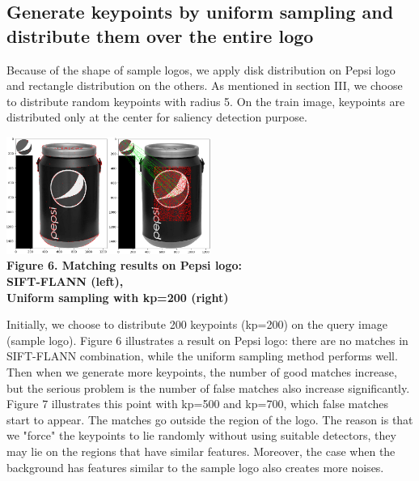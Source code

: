 \documentclass[letterpaper, 10 pt, conference]{ieeeconf}  %
\begin{document}
\subsection{Generate keypoints by uniform sampling and distribute them over the entire logo}
Because of the shape of sample logos, we apply disk distribution on Pepsi logo and rectangle distribution on the others. As mentioned in section III, we choose to distribute random keypoints with radius 5. On the train image, keypoints are distributed only at the center for saliency detection purpose.\par
\begin{center}
\includegraphics[width=0.5\textwidth]{sosanh0_200.png} \\
\textbf{Figure 6. Matching results on Pepsi logo:\\ SIFT-FLANN (left),\\ Uniform sampling with kp=200 (right)}
\end{center}
\par
Initially, we choose to distribute 200 keypoints (kp=200) on the query image (sample logo). Figure 6 illustrates a result on Pepsi logo: there are no matches in SIFT-FLANN combination, while the uniform sampling method performs well. Then when we generate more keypoints, the number of good matches increase, but the serious problem is the number of false matches also increase significantly. Figure 7 illustrates this point with kp=500 and kp=700, which false matches start to appear. The matches go outside the region of the logo. The reason is that we "force" the keypoints to lie randomly without using suitable detectors, they may lie on the regions that have similar features. Moreover, the case when the background has features similar to the sample logo also creates more noises.  \par
\end{document}
